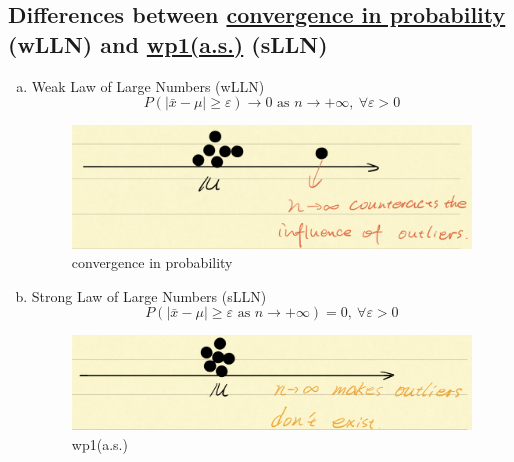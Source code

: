 \documentclass[11pt]{elegantbook}
\begin{document}
\subsection{Differences between \underline{convergence in probability} (wLLN) and \underline{wp1(a.s.)} (sLLN)}
\begin{enumerate}[a)]
    \item Weak Law of Large Numbers (wLLN)
    $$P(|\bar{x}-\mu|\geq\varepsilon)\rightarrow 0\text{ as }n \rightarrow	+\infty,\ \forall \varepsilon>0$$
    \begin{center}\begin{figure}[htbp]
        \centering
        \includegraphics[scale=0.3]{wLLN.png}
        \caption{convergence in probability}
        \label{}
    \end{figure}\end{center}
    \item Strong Law of Large Numbers (sLLN)
    $$P(|\bar{x}-\mu|\geq\varepsilon\text{ as }n \rightarrow+\infty)=0,\ \forall \varepsilon>0$$
    \begin{center}\begin{figure}[htbp]
        \centering
        \includegraphics[scale=0.3]{sLLN.png}
        \caption{wp1(a.s.)}
        \label{}
    \end{figure}\end{center}
\end{enumerate}
\end{document}
